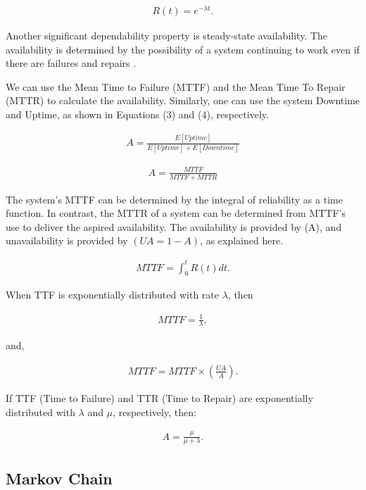 \documentclass[conference]{IEEEtran}
\begin{document}
\begin{align}
R(t) = e^{- \lambda t}.
\end{align}
 
Another significant dependability property is steady-state availability. The availability is determined by the possibility of a system continuing to work even if there are failures and repairs \citep{trivedi2008probability}.

We can use the Mean Time to Failure (MTTF) and the Mean Time To Repair (MTTR) to calculate the availability. Similarly, one can use the system Downtime and Uptime, as shown in Equations (3) and (4), respectively.

\begin{align}
A = \frac{E[Uptime]}{E[Uptime] + E[Downtime]}
\end{align}

\begin{align}
A = \frac{MTTF}{MTTF + MTTR}
\end{align}

The system's MTTF can be determined by the integral of reliability as a time function. In contrast, the MTTR of a system can be determined from MTTF's use to deliver the aspired availability. The availability is provided by (A), and unavailability is provided by $(UA= 1-A)$, as explained here.

\begin{align}
MTTF = \int_{0}^{t} R(t)dt.
\end{align}

When TTF is exponentially distributed with rate $\lambda$, then

\begin{align}
MTTF = \frac{1}{\lambda},
\end{align}

and,

\begin{align}
MTTF = MTTF \times (\frac{UA}{A}).
\end{align}

If TTF (Time to Failure) and TTR (Time to Repair) are exponentially distributed with $\lambda$ and $\mu$, respectively, then:

\begin{align}
A = \frac{\mu}{\mu + \lambda}.
\end{align}

\subsection{Markov Chain}
\end{document}
